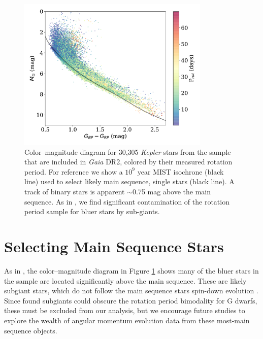 \documentclass[preprint2]{aastex62}
\newcommand{\Kepler}{\textsl{Kepler}\xspace}
\begin{document}
\begin{figure}[]
\centering
\includegraphics[width=3.6in]{../figures/cmd}
\caption{
Color--magnitude diagram for 30,305 \Kepler stars from the \citet{mcquillan2014} sample that are included in {\em Gaia} DR2, colored by their measured rotation period. For reference we show a $10^9$ year MIST isochrone (black line) used to select likely main sequence, single stars (black line). A track of binary stars is apparent $\sim$0.75 mag above the main sequence. As in \citet{davenport2017}, we find significant contamination of the rotation period sample for bluer stars by sub-giants.}
\label{fig:cmd}
\end{figure}




\section{Selecting Main Sequence Stars}

As in \citet{davenport2017}, the color--magnitude diagram in Figure \ref{fig:cmd} shows many of the bluer stars in the \citet{mcquillan2014} sample are located significantly above the main sequence. These are likely subgiant stars, which do not follow the main sequence stars spin-down evolution \citep[e.g.][]{donascimento2012, van-saders2013}. Since \citet{davenport2017} found subgiants could obscure the rotation period bimodality for G dwarfs, these must be excluded from our analysis, but we encourage future studies to explore the wealth of angular momentum evolution data from these most-main sequence objects.
\end{document}
